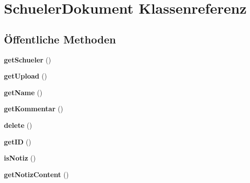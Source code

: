 \hypertarget{class_schueler_dokument}{}\section{Schueler\+Dokument Klassenreferenz}
\label{class_schueler_dokument}
\subsection*{Öffentliche Methoden}
\begin{DoxyCompactItemize}
\item 
\mbox{\label{class_schueler_dokument_a864c52a3814dbdd4f6e1e7d029b7f429}} 
{\bfseries get\+Schueler} ()
\item 
\mbox{\label{class_schueler_dokument_a72d1daa6a61c33013eb5ae0523f7aedd}} 
{\bfseries get\+Upload} ()
\item 
\mbox{\label{class_schueler_dokument_aa4af3a182dc51cfc694e69ee88a7c22e}} 
{\bfseries get\+Name} ()
\item 
\mbox{\label{class_schueler_dokument_aba65d21c486111c5d1553a4d01cdfe7c}} 
{\bfseries get\+Kommentar} ()
\item 
\mbox{\label{class_schueler_dokument_a8a7d1da55acc4ac82bcae4972848b228}} 
{\bfseries delete} ()
\item 
\mbox{\label{class_schueler_dokument_ad5ec390cc6846bc10533c771a32d7ad1}} 
{\bfseries get\+ID} ()
\item 
\mbox{\label{class_schueler_dokument_a0ceda564f9b5bc1a6424cb1053e94363}} 
{\bfseries is\+Notiz} ()
\item 
\mbox{\label{class_schueler_dokument_a0aedc782aadf587e7e0373b9ae07b68c}} 
{\bfseries get\+Notiz\+Content} ()
\end{DoxyCompactItemize}
